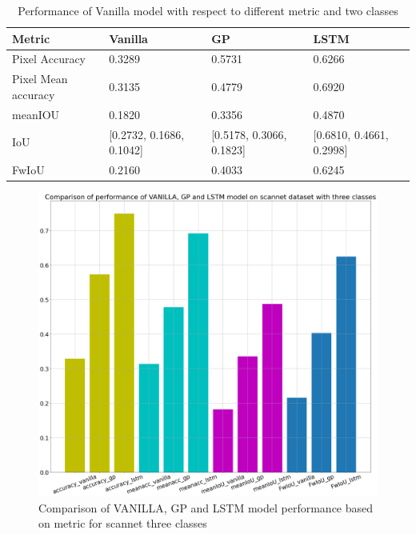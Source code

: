 	\begin{table}[h]
		\begin{center}
			\begin{tabular}{ | l | l | l | p{4cm} |}
				\hline
				
				\cellcolor{purple!30}Metric & \cellcolor{purple!30}Vanilla & \cellcolor{purple!30}GP & \cellcolor{purple!30}LSTM\\ \hline
				Pixel Accuracy & 0.3289 & 0.5731 & 0.6266 \\ \hline
				Pixel Mean accuracy & 0.3135 & 0.4779 & 0.6920 \\ \hline
				meanIOU & 0.1820 & 0.3356 & 0.4870 \\ \hline
				IoU & [0.2732, 0.1686, 0.1042] & [0.5178, 0.3066, 0.1823] & [0.6810, 0.4661, 0.2998] \\ \hline
				FwIoU & 0.2160 & 0.4033 & 0.6245 \\ \hline
				\hline
			\end{tabular}
			\caption{Performance of Vanilla model with respect to different metric and two classes}
			\label{table:unet_scannet_three_classes}
		\end{center}
	\end{table}	
	
	\begin{figure}
		\centering
		\includegraphics[width=12cm]{images/scannet_performance_three_classes.png}
		\caption{Comparison of VANILLA, GP and LSTM model performance based on metric for scannet three classes}
		\label{fig:performance_metric_three_classes_unet}
	\end{figure}

